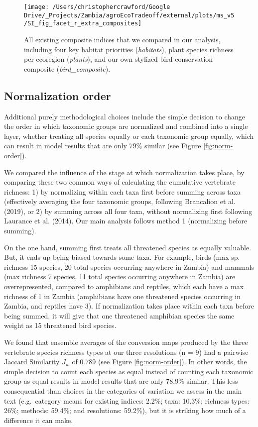 \documentclass[
]{article}
\begin{document}
\begin{figure}
\texttt{[image: /Users/christophercrawford/Google Drive/\_Projects/Zambia/agroEcoTradeoff/external/plots/ms\_v5/SI\_fig\_facet\_r\_extra\_composites]} \caption{All existing composite indices that we compared in our analysis, including four key habitat priorities (\emph{habitats}), plant species richness per ecoregion (\emph{plants}), and our own stylized bird conservation composite (\emph{bird\_composite}).}\label{fig:all-composites}
\end{figure}

\hypertarget{section-norm-order}{%
\subsection{Normalization order}\label{section-norm-order}}

Additional purely methodological choices include the simple decision to change the order in which taxonomic groups are normalized and combined into a single layer, whether treating all species equally or each taxonomic group equally, which can result in model results that are only 79\% similar (see Figure \ref{fig:norm-order}).

We compared the influence of the stage at which normalization takes place, by comparing these two common ways of calculating the cumulative vertebrate richness: 1) by normalizing within each taxa first before summing across taxa (effectively averaging the four taxonomic groups, following Brancalion et al. (2019), or 2) by summing across all four taxa, without normalizing first following Laurance et al. (2014). Our main analysis follows method 1 (normalizing before summing).

On the one hand, summing first treats all threatened species as equally valuable. But, it ends up being biased towards some taxa. For example, birds (max sp. richness 15 species, 20 total species occurring anywhere in Zambia) and mammals (max richness 7 species, 11 total species occurring anywhere in Zambia) are overrepresented, compared to amphibians and reptiles, which each have a max richness of 1 in Zambia (amphibians have one threatened species occurring in Zambia, and reptiles have 3). If normalization takes place within each taxa before being summed, it will give that one threatened amphibian species the same weight as 15 threatened bird species.

We found that ensemble averages of the conversion maps produced by the three vertebrate species richness types at our three resolutions (n = 9) had a pairwise Jaccard Similarity \(J_w\) of 0.789 (see Figure \ref{fig:norm-order}). In other words, the simple decision to count each species as equal instead of counting each taxonomic group as equal results in model results that are only 78.9\% similar. This less consequential than choices in the categories of variation we assess in the main text (e.g.~category means for existing indices: 2.2\%; taxa: 10.3\%; richness types: 26\%; methods: 59.4\%; and resolutions: 59.2\%), but it is striking how much of a difference it can make.
\end{document}
